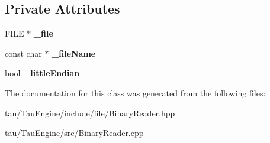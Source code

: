 \subsection*{Private Attributes}
\begin{DoxyCompactItemize}
\item 
\mbox{\label{class_binary_reader_af9d227843a999a8d8a874afbc8362eb5}} 
F\+I\+LE $\ast$ {\bfseries \+\_\+file}
\item 
\mbox{\label{class_binary_reader_ac656c89add5fb8b4ca4729a740a63698}} 
const char $\ast$ {\bfseries \+\_\+file\+Name}
\item 
\mbox{\label{class_binary_reader_a41ddf01f9abe174a960f82bf8cdc8be7}} 
bool {\bfseries \+\_\+little\+Endian}
\end{DoxyCompactItemize}


The documentation for this class was generated from the following files\+:\begin{DoxyCompactItemize}
\item 
tau/\+Tau\+Engine/include/file/Binary\+Reader.\+hpp\item 
tau/\+Tau\+Engine/src/Binary\+Reader.\+cpp\end{DoxyCompactItemize}
